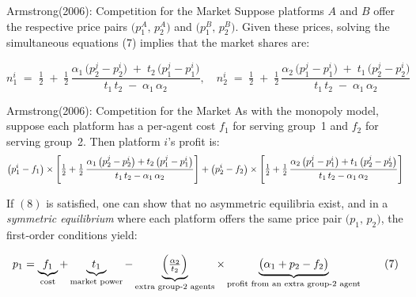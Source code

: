 \documentclass[aspectratio=169]{beamer}  %
\begin{document}
\begin{frame}{Armstrong(2006): Competition for the Market}
    Suppose platforms \(A\) and \(B\) offer the respective price pairs 
    \(\bigl(p_{1}^{A},\,p_{2}^{A}\bigr)\) and \(\bigl(p_{1}^{B},\,p_{2}^{B}\bigr)\). 
    Given these prices, solving the simultaneous equations (7) implies that 
    the market shares are:
    
    \[
      n_{1}^{i} 
      \;=\;
      \tfrac{1}{2}
      \;+\;
      \tfrac{1}{2}\,
      \frac{
        \alpha_{1}\,\bigl(p_{2}^{j} - p_{2}^{i}\bigr)
        \;+\; 
        t_{2}\,\bigl(p_{1}^{j} - p_{1}^{i}\bigr)
      }{
        t_{1}\,t_{2} \;-\; \alpha_{1}\,\alpha_{2}
      },
      \quad
      n_{2}^{i} 
      \;=\; 
      \tfrac{1}{2}
      \;+\;
      \tfrac{1}{2}\,
      \frac{
        \alpha_{2}\,\bigl(p_{1}^{j} - p_{1}^{i}\bigr)
        \;+\;
        t_{1}\,\bigl(p_{2}^{j} - p_{2}^{i}\bigr)
      }{
        t_{1}\,t_{2} \;-\; \alpha_{1}\,\alpha_{2}
      }
    \]
\end{frame}

\begin{frame}{Armstrong(2006): Competition for the Market}
    As with the monopoly model, suppose each platform has a per‐agent cost 
    \(f_{1}\) for serving group~1 and \(f_{2}\) for serving group~2.  Then 
    platform \(i\)’s profit is:
    \begin{equation*}
        \scriptsize
        \bigl(p_{1}^{i} - f_{1}\bigr)
        \times
        \left[
           \tfrac{1}{2} 
           + 
           \tfrac{1}{2}\,\frac{\alpha_{1}\,\bigl(p_{2}^{j}-p_{2}^{i}\bigr) 
                       + t_{2}\,\bigl(p_{1}^{j}-p_{1}^{i}\bigr)}
                      {t_{1}\,t_{2}-\alpha_{1}\,\alpha_{2}}
        \right]
        +
        \bigl(p_{2}^{i} - f_{2}\bigr)
        \times
        \left[
           \tfrac{1}{2} 
           +
           \tfrac{1}{2}\,\frac{\alpha_{2}\,\bigl(p_{1}^{j}-p_{1}^{i}\bigr)
                       + t_{1}\,\bigl(p_{2}^{j}-p_{2}^{i}\bigr)}
                      {t_{1}\,t_{2}-\alpha_{1}\,\alpha_{2}}
        \right]
    \end{equation*}

    
    If \((8)\) is satisfied, one can show that no asymmetric equilibria exist, and in a 
    \emph{symmetric equilibrium} where each platform offers the same price pair 
    \(\bigl(p_{1},\,p_{2}\bigr)\), the first‐order conditions yield:
    
    \[
      p_{1} 
      =
      \underbrace{f_{1}}_{\text{cost}}
      +
      \underbrace{t_{1}}_{\text{market power}}
      -
      \underbrace{\Bigl(\tfrac{\alpha_{2}}{t_{2}}\Bigr)}_{\text{extra group‐2 agents}}
      \times
      \underbrace{\bigl(\alpha_{1} + p_{2} - f_{2}\bigr)}_{\text{profit from an extra group‐2 agent}}
      \tag{7}
    \]

\end{frame}
\end{document}
